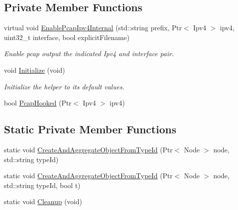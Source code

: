 \subsection*{Private Member Functions}
\begin{DoxyCompactItemize}
\item 
virtual void \hyperlink{classns3_1_1RouterStackHelper_ac294402e8d59a7bdd294332cc4b3d33a}{Enable\-Pcap\-Ipv4\-Internal} (std\-::string prefix, Ptr$<$ Ipv4 $>$ ipv4, uint32\-\_\-t interface, bool explicit\-Filename)
\begin{DoxyCompactList}\small\item\em Enable pcap output the indicated Ipv4 and interface pair. \end{DoxyCompactList}\item 
void \hyperlink{classns3_1_1RouterStackHelper_abd09ae05773a9a706997514d4f807fcb}{Initialize} (void)
\begin{DoxyCompactList}\small\item\em Initialize the helper to its default values. \end{DoxyCompactList}\item 
bool \hyperlink{classns3_1_1RouterStackHelper_aabf5ed0df547a1ab881b9db4604966ca}{Pcap\-Hooked} (Ptr$<$ Ipv4 $>$ ipv4)
\end{DoxyCompactItemize}
\subsection*{Static Private Member Functions}
\begin{DoxyCompactItemize}
\item 
static void \hyperlink{classns3_1_1RouterStackHelper_a2b7ed097c3e34fa5efcd431bf541036e}{Create\-And\-Aggregate\-Object\-From\-Type\-Id} (Ptr$<$ Node $>$ node, std\-::string type\-Id)
\item 
static void \hyperlink{classns3_1_1RouterStackHelper_a216a05a70257f4c669e68b833e8ec6fb}{Create\-And\-Aggregate\-Object\-From\-Type\-Id} (Ptr$<$ Node $>$ node, std\-::string type\-Id, bool t)
\item 
static void \hyperlink{classns3_1_1RouterStackHelper_a6ddb140133a71f5347ecaca6f79ff969}{Cleanup} (void)
\end{DoxyCompactItemize}
